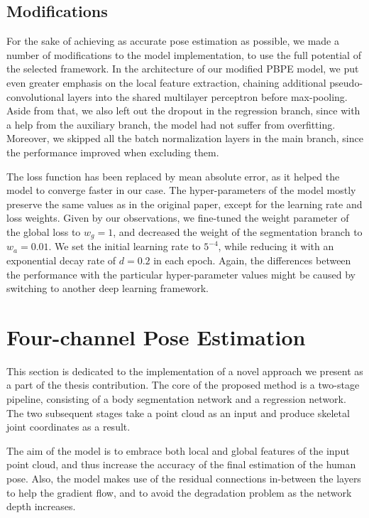 \subsection{Modifications}
For the sake of achieving as accurate pose estimation as possible, we made a number of modifications to the model implementation, to use the full potential of the selected framework. In the architecture of our modified PBPE model, we put even greater emphasis on the local feature extraction, chaining additional pseudo-convolutional layers into the shared multilayer perceptron before max-pooling. Aside from that, we also left out the dropout in the regression branch, since with a help from the auxiliary branch, the model had not suffer from overfitting. Moreover, we skipped all the batch normalization layers in the main branch, since the performance improved when excluding them.\par
\vspace{5mm}
\noindent
The loss function has been replaced by mean absolute error, as it helped the model to converge faster in our case. The hyper-parameters of the model mostly preserve the same values as in the original paper, except for the learning rate and loss weights. Given by our observations, we fine-tuned the weight parameter of the global loss to $w_g=1$, and decreased the weight of the segmentation branch to $w_a = 0.01$. We set the initial learning rate to $5^{-4}$, while reducing it with an exponential decay rate of $d = 0.2$ in each epoch. Again, the differences between the performance with the particular hyper-parameter values might be caused by switching to another deep learning framework. 


\section{Four-channel Pose Estimation} %

This section is dedicated to the implementation of a novel approach we present as a part of the thesis contribution. The core of the proposed method is a two-stage pipeline, consisting of a body segmentation network and a regression network. The two subsequent stages take a point cloud as an input and produce skeletal joint coordinates as a result.\par
\vspace{5mm}
\noindent The aim of the model is to embrace both local and global features of the input point cloud, and thus increase the accuracy of the final estimation of the human pose. Also, the model makes use of the residual connections in-between the layers to help the gradient flow, and to avoid the degradation problem as the network depth increases.



